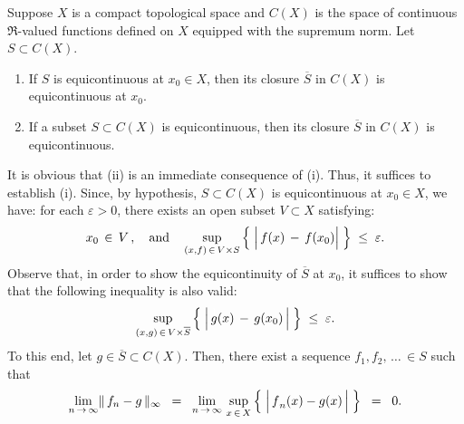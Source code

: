 \begin{proposition}
\label{ClosurePreservesEquicontinuity}
\mbox{}\vskip 0.1cm
\noindent
Suppose $X$ is a compact topological space and
$C(X)$ is the space of continuous $\Re$-valued functions defined on $X$ equipped with the supremum norm.
Let $S \subset C(X)$.
\begin{enumerate}
\item	If $S$ is equicontinuous at $x_{0} \in X$, then its closure $\overline{S}$ in $C(X)$ is equicontinuous at $x_{0}$.
\item	If a subset $S \subset C(X)$ is equicontinuous, then its closure $\overline{S}$ in $C(X)$ is equicontinuous.
\end{enumerate}
\end{proposition}
\proof
It is obvious that (ii) is an immediate consequence of (i).
Thus, it suffices to establish (i).
Since, by hypothesis, $S \subset C(X)$ is equicontinuous at $x_{0} \in X$,
we have:
for each $\varepsilon > 0$, there exists an open subset $V \subset X$ satisfying:
\begin{equation*}
x_{0} \,\in\, V\,,
\quad\textnormal{and}\quad
\sup_{(x,f) \,\in\, V \times S}\left\{\;\left\vert\,\overset{{\color{white}.}}{f}(x)\,-\,f(x_{0})\right\vert\;\right\}
\;\leq\; \varepsilon.
\end{equation*}
Observe that, in order to show the equicontinuity of $\overline{S}$ at $x_{0}$, it suffices to show that
the following inequality is also valid:
\begin{equation*}
\sup_{(x,g) \,\in\, V \times \overline{S}}\left\{\;\left\vert\,\overset{{\color{white}1}}{g}(x)\,-\,g(x_{0})\,\right\vert\;\right\}
\;\leq\; \varepsilon.
\end{equation*}
To this end, let $g \in \overline{S} \subset C(X)$.
Then, there exist a sequence $f_{1}, f_{2},\,\ldots\,\in S$ such that
\begin{equation*}
\underset{n\,\rightarrow\,\infty}{\lim}\Vert\,f_{n} - g\,\Vert_{\infty}
\;\; = \;\; \underset{n\,\rightarrow\,\infty}{\lim}\,\sup_{x\,\in\,X}\left\{\; \left\vert\, \overset{{\color{white}.}}{f}_{n}(x) - g(x)\,\right\vert \;\right\}
\;\; = \;\; 0.
\end{equation*}
